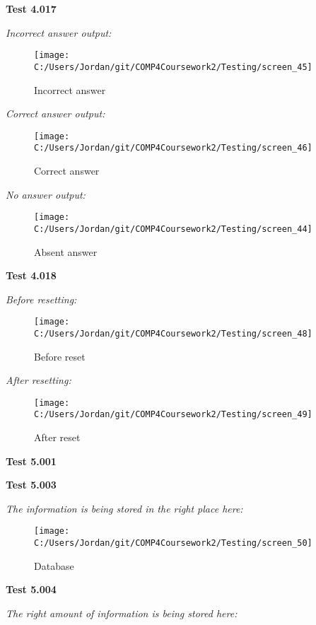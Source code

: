 \textbf{Test 4.017}

\textit{Incorrect answer output: }

\begin{figure}[H]
    \label{fig: Second Screen}\caption{Incorrect answer}
    \texttt{[image: C:/Users/Jordan/git/COMP4Coursework2/Testing/screen\_45]}
\end{figure}

\textit{Correct answer output: }

\begin{figure}[H]
    \label{fig: Second Screen}\caption{Correct answer}
    \texttt{[image: C:/Users/Jordan/git/COMP4Coursework2/Testing/screen\_46]}
\end{figure}

\textit{No answer output: }

\begin{figure}[H]
    \label{fig: Second Screen}\caption{Absent answer}
    \texttt{[image: C:/Users/Jordan/git/COMP4Coursework2/Testing/screen\_44]}
\end{figure}

\textbf{Test 4.018}

\textit{Before resetting: }

\begin{figure}[H]
    \label{fig: Second Screen}\caption{Before reset}
    \texttt{[image: C:/Users/Jordan/git/COMP4Coursework2/Testing/screen\_48]}
\end{figure}

\textit{After resetting: }

\begin{figure}[H]
    \label{fig: Second Screen}\caption{After reset}
    \texttt{[image: C:/Users/Jordan/git/COMP4Coursework2/Testing/screen\_49]}
\end{figure}

\textbf{Test 5.001}

\textbf{Test 5.003}

\textit{The information is being stored in the right place here: }

\begin{figure}[H]
    \label{fig: Second Screen}\caption{Database}
    \texttt{[image: C:/Users/Jordan/git/COMP4Coursework2/Testing/screen\_50]}
\end{figure}

\textbf{Test 5.004}

\textit{The right amount of information is being stored here: }

